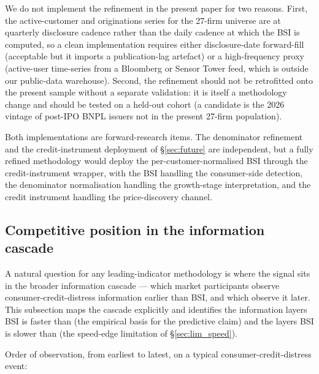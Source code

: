 \documentclass[11pt,a4paper]{article}
\begin{document}
We do not implement the refinement in the present paper for two reasons. First, the active-customer and originations series for the 27-firm universe are at quarterly disclosure cadence rather than the daily cadence at which the BSI is computed, so a clean implementation requires either disclosure-date forward-fill (acceptable but it imports a publication-lag artefact) or a high-frequency proxy (active-user time-series from a Bloomberg or Sensor Tower feed, which is outside our public-data warehouse). Second, the refinement should not be retrofitted onto the present sample without a separate validation: it is itself a methodology change and should be tested on a held-out cohort (a candidate is the 2026 vintage of post-IPO BNPL issuers not in the present 27-firm population).

Both implementations are forward-research items. The denominator refinement and the credit-instrument deployment of §\ref{sec:future} are independent, but a fully refined methodology would deploy the per-customer-normalised BSI through the credit-instrument wrapper, with the BSI handling the consumer-side detection, the denominator normalisation handling the growth-stage interpretation, and the credit instrument handling the price-discovery channel.

\subsection{Competitive position in the information cascade}\label{sec:cascade}

A natural question for any leading-indicator methodology is where the signal sits in the broader information cascade --- which market participants observe consumer-credit-distress information earlier than BSI, and which observe it later. This subsection maps the cascade explicitly and identifies the information layers BSI is faster than (the empirical basis for the predictive claim) and the layers BSI is slower than (the speed-edge limitation of §\ref{sec:lim_speed}).

Order of observation, from earliest to latest, on a typical consumer-credit-distress event:
\end{document}
